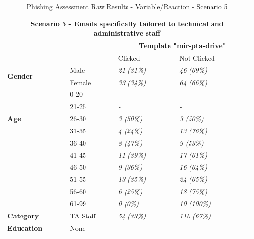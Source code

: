 \documentclass[a4paper]{article}
\begin{document}
\begingroup
\renewcommand{\arraystretch}{1.25}
\begin{table}[ht]
\begin{center}
    \begin{tabular}{ | m{7em} | m{9em} | m{9em} | m{9em} | }
    \hline
    \multicolumn{4}{|c|}{\textbf{Scenario 5 -  Emails specifically tailored to technical and administrative staff}} \\ \hline
    & & \multicolumn{2}{|c|}{\textbf{Template "mir-pta-drive"}} \\ \hline
    & & Clicked & Not Clicked \\ \hline
    
    \multirow{2}{*}{\textbf{Gender}} 
    & Male & \textit{21 (31\%)} & \textit{46 (69\%)} \\ \cline{2-4}
    & Female & \textit{33 (34\%)} & \textit{64 (66\%)} \\ \hline
    
    \multirow{5}{*}{\textbf{Age}} 
    & 0-20 & \textit{-} & \textit{-} \\ \cline{2-4}
    & 21-25 & \textit{-} & \textit{-} \\ \cline{2-4}
    & 26-30 & \textit{3 (50\%)} & \textit{3 (50\%)} \\ \cline{2-4}
    & 31-35 & \textit{4 (24\%)} & \textit{13 (76\%)} \\ \cline{2-4}
    & 36-40 & \textit{8 (47\%)} & \textit{9 (53\%)} \\ \cline{2-4}
    & 41-45 & \textit{11 (39\%)} & \textit{17 (61\%)} \\ \cline{2-4}
    & 46-50 & \textit{9 (36\%)} & \textit{16 (64\%)} \\ \cline{2-4}
    & 51-55 & \textit{13 (35\%)} & \textit{24 (65\%)} \\ \cline{2-4}
    & 56-60 & \textit{6 (25\%)} & \textit{18 (75\%)} \\ \cline{2-4}
    & 61-99 & \textit{0 (0\%)} & \textit{10 (100\%)} \\ \hline
    
    \multirow{1}{*}{\textbf{Category}} 
    & TA Staff & \textit{54 (33\%)} & \textit{110 (67\%)} \\ \hline
    
    \multirow{1}{*}{\textbf{Education}}
    & None & \textit{-} & \textit{-} \\ \hline
    \end{tabular}
\end{center}
\caption{Phishing Assessment Raw Results - Variable/Reaction - Scenario 5}
\label{t-varreact5}
\end{table}
\endgroup
\end{document}
